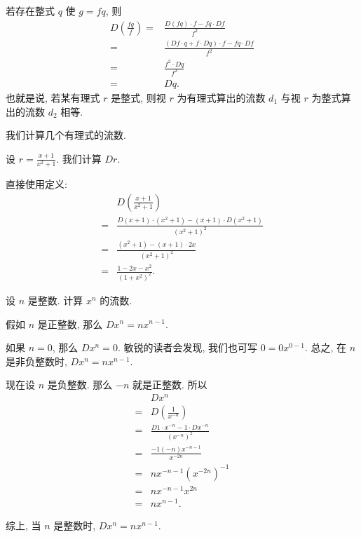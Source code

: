 \begin{remark}
    若存在整式 $q$ 使 $g = fq$, 则
    \begin{align*}
        D \left( \frac{fq}{f} \right)
        = {} & \frac{D(fq) \cdot f - fq \cdot Df}{f^2}                     \\
        = {} & \frac{(Df \cdot q + f \cdot Dq) \cdot f - fq \cdot Df}{f^2} \\
        = {} & \frac{f^2 \cdot Dq}{f^2}                                    \\
        = {} & Dq.
    \end{align*}
    也就是说, 若某有理式 $r$ 是整式, 则视 $r$ 为有理式算出的流数 $d_1$ 与视 $r$ 为整式算出的流数 $d_2$ 相等.
\end{remark}

我们计算几个有理式的流数.

\begin{example}
    设 $r = \frac{x + 1}{x^2 + 1}$. 我们计算 $Dr$.

    直接使用定义:
    \begin{align*}
             & D \left( \frac{x + 1}{x^2 + 1} \right)                                  \\
        = {} & \frac{D(x + 1) \cdot (x^2 + 1) - (x + 1) \cdot D(x^2 + 1)}{(x^2 + 1)^2} \\
        = {} & \frac{(x^2 + 1) - (x + 1) \cdot 2x}{(x^2 + 1)^2}                        \\
        = {} & \frac{1 - 2x - x^2}{(1 + x^2)^2}.
    \end{align*}
\end{example}

\begin{example}
    设 $n$ 是整数. 计算 $x^n$ 的流数.

    假如 $n$ 是正整数, 那么 $Dx^n = nx^{n-1}$.

    如果 $n = 0$, 那么 $Dx^n = 0$. 敏锐的读者会发现, 我们也可写 $0 = 0x^{0-1}$. 总之, 在 $n$ 是非负整数时, $Dx^n = nx^{n-1}$.

    现在设 $n$ 是负整数. 那么 $-n$ 就是正整数. 所以
    \begin{align*}
             & Dx^n                                                 \\
        = {} & D \left( \frac{1}{x^{-n}} \right)                    \\
        = {} & \frac{D1 \cdot x^{-n} - 1 \cdot Dx^{-n}}{(x^{-n})^2} \\
        = {} & \frac{-1 (-n) x^{-n-1}}{x^{-2n}}                     \\
        = {} & n x^{-n-1} (x^{-2n})^{-1}                            \\
        = {} & n x^{-n-1} x^{2n}                                    \\
        = {} & n x^{n-1}.
    \end{align*}

    综上, 当 $n$ 是整数时, $Dx^n = nx^{n-1}$.
\end{example}

